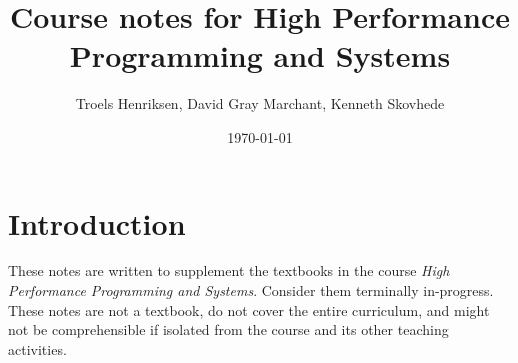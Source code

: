 \documentclass[oneside]{memoir}
\title{Course notes for High Performance Programming and Systems}
\author{Troels Henriksen, David Gray Marchant, Kenneth Skovhede} \date{\today}
\begin{document}
\maketitle

\section{Introduction}

These notes are written to supplement the textbooks in the course
\textit{High Performance Programming and Systems}.  Consider them
terminally in-progress.  These notes are not a textbook, do not cover
the entire curriculum, and might not be comprehensible if isolated
from the course and its other teaching activities.

\newpage
\tableofcontents















\newpage



\end{document}
